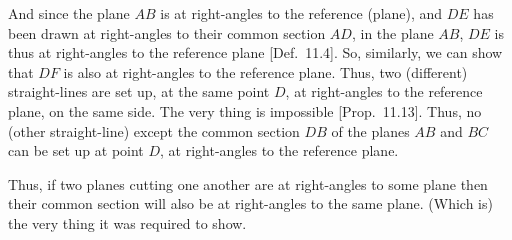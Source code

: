\begin{Parallel}{}{}
{And since the plane $AB$ is at right-angles to the reference (plane),
and $DE$ has been drawn at right-angles to their common section $AD$,
in the plane $AB$, $DE$ is thus at right-angles to the reference 
plane [Def.~11.4]. So, similarly, we can show that
$DF$ is also at right-angles to the reference plane. Thus, two (different) straight-lines
are set up, at the same point $D$, at right-angles to the reference plane,
on the same side. The very thing is impossible [Prop.~11.13]. Thus, no (other straight-line) except the common section
$DB$ of the planes $AB$ and $BC$ can be set up at point $D$,
at right-angles to the reference plane.

Thus, if two planes cutting one another are at right-angles to some plane then their common section will also be at right-angles to the
same plane. (Which is) the very thing it was required to show.}
\end{Parallel}

